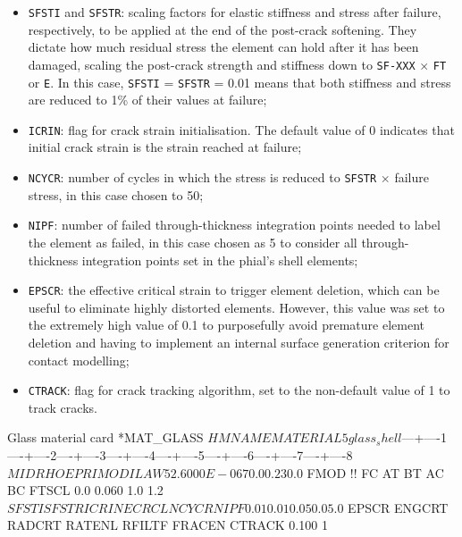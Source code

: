 \begin{itemize}
  \item \texttt{SFSTI} and \texttt{SFSTR}: scaling factors for elastic stiffness and stress after failure, respectively, to be applied at the end of the post-crack softening. They dictate how much residual stress the element can hold after it has been damaged, scaling the post-crack strength and stiffness down to \texttt{SF-XXX} $\times$ \texttt{FT} or \texttt{E}. In this case, \texttt{SFSTI} = \texttt{SFSTR} = 0.01 means that both stiffness and stress are reduced to 1\% of their values at failure; 
  \item \texttt{ICRIN}: flag for crack strain initialisation. The default value of 0 indicates that initial crack strain is the strain reached at failure;
  \item \texttt{NCYCR}: number of cycles in which the stress is reduced to \texttt{SFSTR} $\times$ failure stress, in this case chosen to 50;
  \item \texttt{NIPF}: number of failed through-thickness integration points needed to label the element as failed, in this case chosen as 5 to consider all through-thickness integration points set in the phial's shell elements;
  \item \texttt{EPSCR}: the effective critical strain to trigger element deletion, which can be useful to eliminate highly distorted elements. However, this value was set to the extremely high value of 0.1 to purposefully avoid premature element deletion and having to implement an internal surface generation criterion for contact modelling;
  \item \texttt{CTRACK}: flag for crack tracking algorithm, set to the non-default value of 1 to track cracks. 
\end{itemize}

\begin{dynacard}[label=lst:mat-glass-raw]{Glass material card}
*MAT_GLASS
$HMNAME MATERIAL         5glass_shell
$---+----1----+----2----+----3----+----4----+----5----+----6----+----7----+----8
$      MID       RHO         E        PR                          IMOD      ILAW
         52.6000E-06      70.0      0.23                                     0.0
$     FMOD        !!         FC        AT        BT        AC        BC     FTSCL
       0.0     0.060        1.0                                               1.2
$    SFSTI     SFSTR     ICRIN     ECRCL     NCYCR      NIPF
      0.01      0.01       0.0                50.0       5.0
$    EPSCR    ENGCRT    RADCRT    RATENL    RFILTF    FRACEN    CTRACK
     0.100                                                           1
\end{dynacard}


